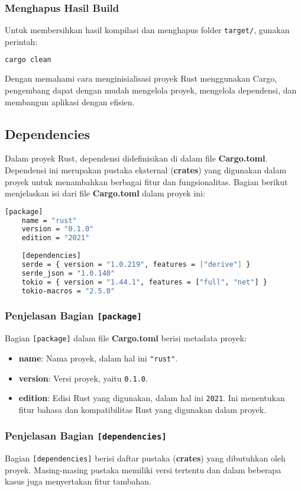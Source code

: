 \subsubsection{Menghapus Hasil Build}
Untuk membersihkan hasil kompilasi dan menghapus folder \texttt{target/}, gunakan perintah:
\begin{lstlisting}[language=bash]
	cargo clean
\end{lstlisting}

Dengan memahami cara menginisialisasi proyek Rust menggunakan Cargo, pengembang dapat dengan mudah mengelola proyek, mengelola dependensi, dan membangun aplikasi dengan efisien.


\subsection{Dependencies}

Dalam proyek Rust, dependensi didefinisikan di dalam file \textbf{Cargo.toml}. Dependensi ini merupakan pustaka eksternal (\textbf{crates}) yang digunakan dalam proyek untuk menambahkan berbagai fitur dan fungsionalitas. Bagian berikut menjelaskan isi dari file \textbf{Cargo.toml} dalam proyek ini:

\begin{lstlisting}[language=bash]
	[package]
	name = "rust"
	version = "0.1.0"
	edition = "2021"
	
	[dependencies]
	serde = { version = "1.0.219", features = ["derive"] }
	serde_json = "1.0.140"
	tokio = { version = "1.44.1", features = ["full", "net"] }
	tokio-macros = "2.5.0"
\end{lstlisting}

\subsubsection{Penjelasan Bagian \texttt{[package]}}
Bagian \texttt{[package]} dalam file \textbf{Cargo.toml} berisi metadata proyek:
\begin{itemize}
	\item \textbf{name}: Nama proyek, dalam hal ini \texttt{"rust"}.
	\item \textbf{version}: Versi proyek, yaitu \texttt{0.1.0}.
	\item \textbf{edition}: Edisi Rust yang digunakan, dalam hal ini \texttt{2021}. Ini menentukan fitur bahasa dan kompatibilitas Rust yang digunakan dalam proyek.
\end{itemize}

\subsubsection{Penjelasan Bagian \texttt{[dependencies]}}
Bagian \texttt{[dependencies]} berisi daftar pustaka (\textbf{crates}) yang dibutuhkan oleh proyek. Masing-masing pustaka memiliki versi tertentu dan dalam beberapa kasus juga menyertakan fitur tambahan.

